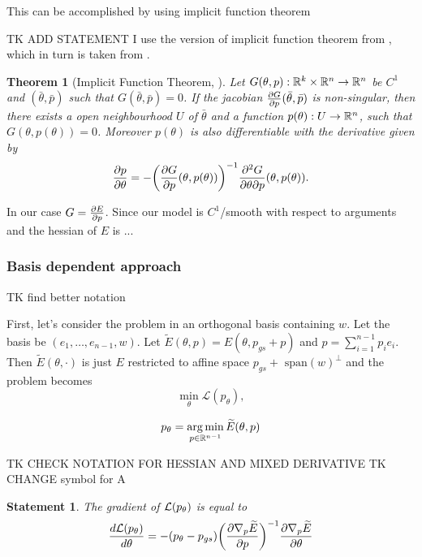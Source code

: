 \documentclass[a4paper,10pt]{report}
\newtheorem{theorem}{Theorem}
\newtheorem{statement}{Statement}
\begin{document}
This can be accomplished by using implicit function theorem

TK ADD STATEMENT
I use the version of implicit function theorem from \cite{zucchet2022beyond}, which in turn is taken from \cite{dontchev2009implicit}.
\begin{theorem}[Implicit Function Theorem, \cite{zucchet2022beyond} ]
Let $G(\theta, p): \mathbb{R}^k \times \mathbb{R}^n \to \mathbb{R}^n$ be $C^1$ and $(\bar{\theta}, \bar{p})$ such that $G(\bar{\theta},\bar{p})=0$. If the jacobian
$\frac{\partial G}{\partial p}(\bar{\theta},\bar{p})$ is non-singular, then there exists a open neighbourhood $U$ of $\bar{\theta} $ and a function $p(\theta):U \to \mathbb{R}^n$, such that $G(\theta, p(\theta)) = 0$. Moreover $p(\theta)$ is also differentiable with
the  derivative given by
\begin{equation}
\frac{\partial p}{\partial \theta}= - \bigg(\frac{\partial G}{\partial p}(\theta, p(\theta))\bigg)^{-1} \frac{\partial^2 G}{\partial \theta \partial p}(\theta, p(\theta)).
\end{equation}

\end{theorem}
In our case $G = \frac{\partial E}{\partial p}$. Since our model is $C^1$/smooth with respect to  arguments and the hessian of $E$ is ...

\subsubsection{Basis dependent approach}
TK find better notation

First, let's consider the problem in an orthogonal basis containing $w$.
Let the basis be $(e_1,\ldots, e_{n-1}, w)$.
Let $\widetilde{E}(\theta, p) = E(\theta, p_{gs}+ p)$ and $p = \sum_{i=1}^{n-1} p_i e_i$.
Then $\widetilde E(\theta, \cdot)$ is just $E$ restricted to affine space $p_{gs}+\text{ span} (w)^\perp$
and the problem becomes
\begin{equation}
  \min_\theta \mathcal{L}(p_\theta),
\end{equation}


\begin{equation}
 p_\theta = \operatorname*{arg\,min}_{p\in \mathbb{R}^{n-1}} \widetilde{E}(\theta, p)
\end{equation}


TK CHECK NOTATION FOR HESSIAN AND MIXED DERIVATIVE
TK CHANGE symbol for A
\begin{statement}
The gradient of $\mathcal{L}(p_\theta)$ is equal to
 \begin{equation}
 \frac{d\mathcal{L}(p_\theta)}{d \theta} = -(p_\theta - p_{gs}) \bigg(\frac{\partial \nabla_p \widetilde{E}}{\partial p}\bigg)^{-1}  \frac{\partial  \nabla_p \widetilde{E}}{\partial \theta}
\end{equation}
\end{statement}
\end{document}
